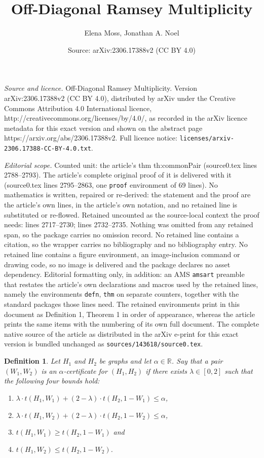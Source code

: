 \documentclass[10pt,a4paper]{amsart}
\title{Off-Diagonal Ramsey Multiplicity}
\author{Elena Moss, Jonathan A. Noel}
\date{Source: arXiv:2306.17388v2 (CC BY 4.0)}
\newtheorem{defn}{Definition}
\begin{document}
\maketitle

\noindent\emph{Source and licence.} Off-Diagonal Ramsey Multiplicity. Version arXiv:2306.17388v2 (CC BY 4.0), distributed by arXiv under the Creative Commons Attribution 4.0 International licence, http://creativecommons.org/licenses/by/4.0/, as recorded in the arXiv licence metadata for this exact version and shown on the abstract page https://arxiv.org/abs/2306.17388v2. Full licence notice: \texttt{licenses/arxiv-2306.17388-CC-BY-4.0.txt}.\par\smallskip

\noindent\textit{Editorial scope.} Counted unit: the article's thm th:commonPair (source0.tex lines 2788--2793). The article's complete original proof of it is delivered with it (source0.tex lines 2795--2863, one \texttt{proof} environment of 69 lines). No mathematics is written, repaired or re-derived: the statement and the proof are the article's own lines, in the article's own notation, and no retained line is substituted or re-flowed.  Retained uncounted as the source-local context the proof needs: lines 2717--2730; lines 2732--2735.  Nothing was omitted from any retained span, so the package carries no omission record.  No retained line contains a citation, so the wrapper carries no bibliography and no bibliography entry.  No retained line contains a figure environment, an image-inclusion command or drawing code, so no image is delivered and the package declares no asset dependency.  Editorial formatting only, in addition: an AMS \texttt{amsart} preamble that restates the article's own declarations and macros used by the retained lines, namely the environments \texttt{defn}, \texttt{thm} on separate counters, together with the standard packages those lines need.  The retained environments print in this document as Definition 1, Theorem 1 in order of appearance, whereas the article prints the same items with the numbering of its own full document.  The complete native source of the article as distributed in the arXiv e-print for this exact version is bundled unchanged as \texttt{sources/143618/source0.tex}.
\begin{defn}
\label{defn:certificate}
Let $H_1$ and $H_2$ be graphs and let $\alpha\in\mathbb{R}$. Say that a pair $(W_1,W_2)$ is an \emph{$\alpha$-certificate} for $(H_1,H_2)$ if there exists $\lambda\in[0,2]$ such that the following four bounds hold:
\begin{enumerate}
 \item\label{eq:ralpha} $\lambda\cdot t(H_1,W_1) + (2-\lambda)\cdot t(H_2,1-W_1) \leq \alpha$,
 \item\label{eq:balpha} $\lambda\cdot t(H_1,W_2) + (2-\lambda)\cdot t(H_2,1-W_2) \leq \alpha$,
 \item\label{eq:rbigger}$t(H_1,W_1)\geq t(H_2,1-W_1)$ and
 \item\label{eq:bbigger} $t(H_1,W_2)\leq t(H_2,1-W_2)$.
\end{enumerate}
\end{defn}
\end{document}
